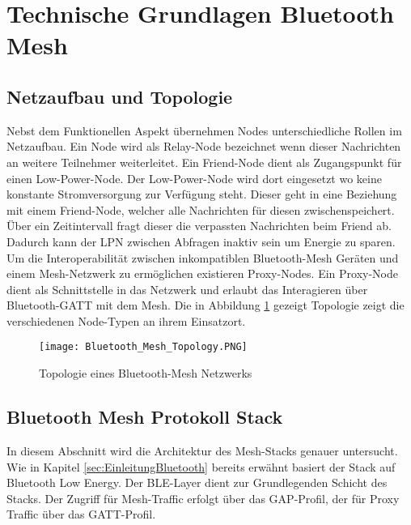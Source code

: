 \clearpage
\section{Technische Grundlagen Bluetooth Mesh}\label{sec:TechnischeGrundlagenBluetoothMesh}




\subsection{Netzaufbau und Topologie}\label{sec:NetzaufbauundTopologie}

Nebst dem Funktionellen Aspekt übernehmen Nodes unterschiedliche Rollen im Netzaufbau. Ein Node wird als Relay-Node bezeichnet wenn dieser Nachrichten an weitere Teilnehmer weiterleitet. Ein Friend-Node dient als Zugangspunkt für einen Low-Power-Node. Der Low-Power-Node wird dort eingesetzt wo keine konstante Stromversorgung zur Verfügung steht. Dieser geht in eine Beziehung mit einem Friend-Node, welcher alle Nachrichten für diesen zwischenspeichert. Über ein Zeitintervall fragt dieser die verpassten Nachrichten beim Friend ab. Dadurch kann der LPN zwischen Abfragen inaktiv sein um Energie zu sparen. Um die Interoperabilität zwischen inkompatiblen Bluetooth-Mesh Geräten und einem Mesh-Netzwerk zu ermöglichen existieren Proxy-Nodes. Ein Proxy-Node dient als Schnittstelle in das Netzwerk und erlaubt das Interagieren über Bluetooth-GATT mit dem Mesh. Die in Abbildung \ref{fig:BTMeshTopology} gezeigt Topologie zeigt die verschiedenen Node-Typen an ihrem Einsatzort. 

\begin{figure} [H]
	\centering
	\texttt{[image: Bluetooth\_Mesh\_Topology.PNG]}
	\caption{Topologie eines Bluetooth-Mesh Netzwerks \cite{bluetooth_sig_mesh_netzwerk_spezifikationen_2020}} 
	\label{fig:BTMeshTopology}
\end{figure}






\subsection{Bluetooth Mesh Protokoll Stack}\label{sec:ZigbeeProtokollStack}

In diesem Abschnitt wird die Architektur des Mesh-Stacks genauer untersucht. Wie in Kapitel \ref{sec:EinleitungBluetooth} bereits erwähnt basiert der Stack auf Bluetooth Low Energy. Der BLE-Layer dient zur Grundlegenden Schicht des Stacks. Der Zugriff für Mesh-Traffic erfolgt über das GAP-Profil, der für Proxy Traffic über das GATT-Profil. 

